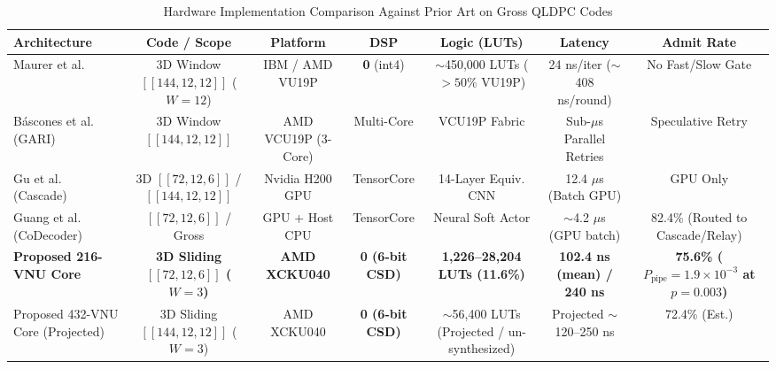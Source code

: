 \begin{table}[t]
\caption{Hardware Implementation Comparison Against Prior Art on Gross QLDPC Codes}
\label{tab:prior_art}
\centering
\begin{tabular}{lcccccc}
\toprule
\textbf{Architecture} & \textbf{Code / Scope} & \textbf{Platform} & \textbf{DSP} & \textbf{Logic (LUTs)} & \textbf{Latency} & \textbf{Admit Rate} \\
\midrule
Maurer et al.~\cite{maurer2025fpga} & 3D Window $[[144,12,12]]$ ($W=12$) & IBM / AMD VU19P & \textbf{0} (int4) & $\sim$450,000 LUTs ($>50\%$ VU19P) & 24 ns/iter ($\sim$408 ns/round) & No Fast/Slow Gate \\
B{\'a}scones et al. (GARI)~\cite{cowtan2024modular} & 3D Window $[[144,12,12]]$ & AMD VCU19P (3-Core) & Multi-Core & VCU19P Fabric & Sub-$\mu$s Parallel Retries & Speculative Retry \\
Gu et al. (Cascade)~\cite{gu2026cascade} & 3D $[[72,12,6]]$ / $[[144,12,12]]$ & Nvidia H200 GPU & TensorCore & 14-Layer Equiv. CNN & 12.4 $\mu$s (Batch GPU) & GPU Only \\
Guang et al. (CoDecoder)~\cite{codecoder2026} & $[[72,12,6]]$ / Gross & GPU + Host CPU & TensorCore & Neural Soft Actor & $\sim$4.2 $\mu$s (GPU batch) & 82.4\% (Routed to Cascade/Relay) \\
\textbf{Proposed 216-VNU Core} & \textbf{3D Sliding $[[72,12,6]]$ ($W=3$)} & \textbf{AMD XCKU040} & \textbf{0 (6-bit CSD)} & \textbf{1,226--28,204 LUTs (11.6\%)} & \textbf{102.4 ns (mean) / 240 ns} & \textbf{75.6\% ($P_{\text{pipe}} = 1.9\times 10^{-3}$ at $p=0.003$)} \\
Proposed 432-VNU Core (Projected) & 3D Sliding $[[144,12,12]]$ ($W=3$) & AMD XCKU040 & \textbf{0 (6-bit CSD)} & $\sim$56,400 LUTs (Projected / un-synthesized) & Projected $\sim$120--250 ns & 72.4\% (Est.) \\
\bottomrule
\end{tabular}
\end{table}
